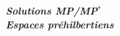 \documentclass[12pt]{article}
\begin{document}
\begin{titlepage}
	\centering
	\vspace*{\fill}
	\Huge \textit{\textbf{Solutions MP/MP$^*$\\ Espaces préhilbertiens}}
	\vspace*{\fill}
\end{titlepage}
\end{document}

